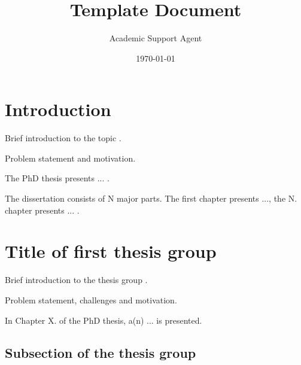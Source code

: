 \documentclass{article}
\title{Template Document}
\author{Academic Support Agent}
\date{\today}
\begin{document}
\maketitle

\nobibliography*


 
\newpage
\thispagestyle{empty}
\mbox{}

\newpage

\setcounter{page}{1}
 
\newpage
\section{Introduction}

Brief introduction to the topic \cite{b:arrl}. 

Problem statement and motivation.

The PhD thesis presents ... .

The dissertation consists of N major parts. The first chapter presents ..., the N. chapter presents ... .

\section{Title of first thesis group}

Brief introduction to the thesis group \cite{b:duckworth99}.

Problem statement, challenges and motivation.

In Chapter X. of the PhD thesis, a(n) ... is presented.

\subsection{Subsection of the thesis group}

\end{document}
